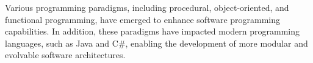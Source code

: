 Various programming paradigms, including procedural, object-oriented, and functional
programming, have emerged to enhance software programming capabilities. In addition, these
paradigms have impacted modern programming languages, such as Java and C\#, enabling the
development of more modular and evolvable software architectures.









